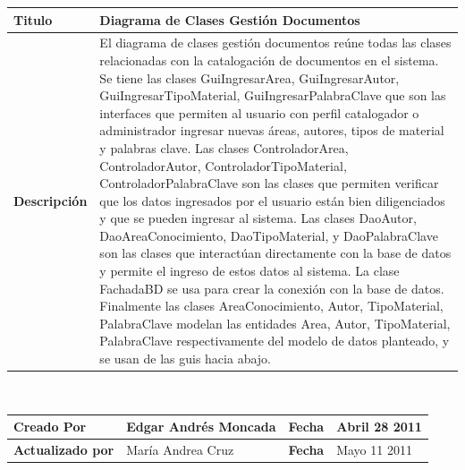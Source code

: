 		
	\begin{tabular}{|p{5cm}|p{11cm}|}\hline
	{\bf Titulo} & {Diagrama de Clases Gestión Documentos}\\
	\hline
	{\bf Descripción} & {El diagrama de clases gestión documentos reúne todas las
	clases relacionadas con la catalogación de documentos en el sistema.\newline
	Se tiene las clases GuiIngresarArea, GuiIngresarAutor, GuiIngresarTipoMaterial, 
	GuiIngresarPalabraClave que son las interfaces que permiten al usuario con perfil
	catalogador o administrador ingresar nuevas áreas, autores, tipos de material y palabras
	clave.\newline
	Las clases ControladorArea, ControladorAutor, ControladorTipoMaterial, ControladorPalabraClave
	son las clases que permiten verificar que los datos ingresados por el usuario están bien 
	diligenciados y que se pueden ingresar al sistema. Las clases DaoAutor, DaoAreaConocimiento,
	DaoTipoMaterial, y DaoPalabraClave son las clases que interactúan directamente con la 
	base de datos y permite el ingreso de estos datos al sistema. La clase FachadaBD se usa
	para crear la conexión con la base de datos.\newline
	Finalmente las clases AreaConocimiento, Autor, TipoMaterial, PalabraClave modelan las entidades
	Area, Autor, TipoMaterial, PalabraClave respectivamente del modelo de datos planteado, y se 
	usan de las guis hacia abajo.}\\
	\hline
	\end{tabular}\\[.5cm]
		
	\begin{tabular}{|p{3.5cm}|p{4.5cm}|p{2.5cm}|p{4.5cm}|}\hline
	{\bf Creado Por} & {Edgar Andrés Moncada} & {\bf Fecha} & {Abril 28 2011}\\
	\hline
	{\bf Actualizado por} & {María Andrea Cruz} & {\bf Fecha} & {Mayo 11 2011}\\
	\hline
	\end{tabular}

